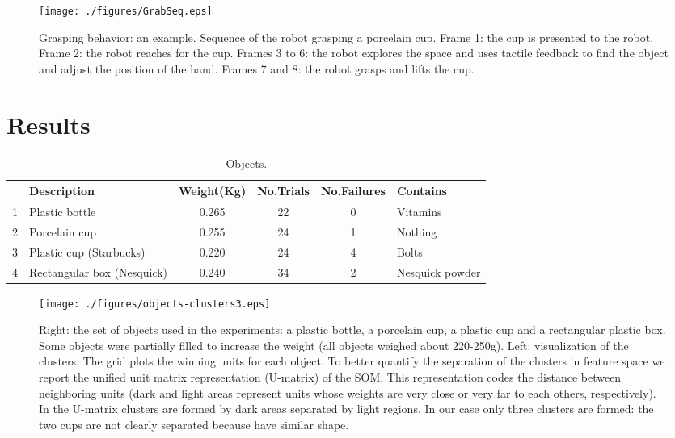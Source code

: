 \begin{figure*}[tb]
\centerline{
\texttt{[image: ./figures/GrabSeq.eps]}
} \caption{Grasping behavior: an example. Sequence of the robot 
grasping a porcelain cup. Frame 1: the cup is presented to the 
robot. Frame 2: the robot reaches for the cup. Frames 3 to 6:  
the robot explores the
space and uses tactile feedback to find the object and adjust the
position of the hand. Frames 7 and 8: the robot grasps 
and lifts the cup.} \label{fig:sequence}
\end{figure*}

\section{Results}
\label{sec:results}

\begin{table*}[htb]
  \caption{Objects.} \label{tab:objects} \centering
  \begin{tabular}{|c|l|c|c|c|l|}
    \hline
    &Description& Weight(Kg)&No.Trials&No.Failures&Contains \\
    \hline
    1&Plastic bottle        & 0.265 & 22& 0 & Vitamins\\
    2&Porcelain cup & 0.255 & 24& 1 & Nothing\\
    3&Plastic cup (Starbucks)      & 0.220 & 24& 4 & Bolts \\
    4&Rectangular box (Nesquick)        & 0.240 & 34& 2 & Nesquick powder\\

    \hline
  \end{tabular}
\end{table*}

\begin{figure*}[tbp]
\centerline{
\texttt{[image: ./figures/objects-clusters3.eps]}
}\caption{Right: the set of objects used in the experiments: a plastic bottle,
a porcelain cup, a plastic cup and a rectangular plastic box. Some objects were
partially filled to increase the weight (all objects weighed about 220-250g).
Left: visualization of the clusters. The grid plots the winning units for each object. To better quantify the separation of the clusters in feature space we report the unified unit matrix representation (U-matrix) of the SOM. This representation codes the distance between neighboring units (dark and light areas represent units whose weights are very close or very far to each others, respectively). In the U-matrix clusters are formed by dark areas separated by light regions. In our case only three clusters are formed: the two cups are not clearly separated because have similar shape.}
\label{fig:Objects}
\end{figure*}

